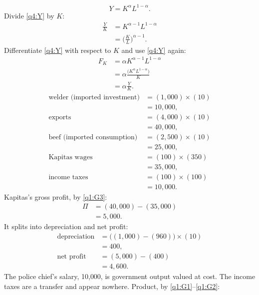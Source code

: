 \begin{sol}
\begin{equation}
Y=K^{\alpha}L^{1-\alpha}. \label{q4:Y}
\end{equation}
Divide \eqref{q4:Y} by $K$:
\begin{align*}
\frac YK &= K^{\alpha-1}L^{1-\alpha}\\
&= \Big(\frac KL\Big)^{\alpha-1}.
\end{align*}
Differentiate \eqref{q4:Y} with respect to $K$ and use \eqref{q4:Y} again:
\begin{align}
F_K &= \alpha K^{\alpha-1}L^{1-\alpha} \nonumber\\
&= \alpha\frac{\big(K^{\alpha}L^{1-\alpha}\big)}{K} \nonumber\\
&= \alpha\frac YK. \label{q4:FK}
\end{align}
\begin{align*}
\text{welder (imported investment)} &= (1{,}000)\times(10)\\
&= 10{,}000,\\
\text{exports} &= (4{,}000)\times(10)\\
&= 40{,}000,\\
\text{beef (imported consumption)} &= (2{,}500)\times(10)\\
&= 25{,}000,\\
\text{Kapitas wages} &= (100)\times(350)\\
&= 35{,}000,\\
\text{income taxes} &= (100)\times(100)\\
&= 10{,}000.
\end{align*}
Kapitas's gross profit, by \eqref{q1:G3}:
\begin{align*}
\Pi &= (40{,}000)-(35{,}000)\\
&= 5{,}000 .
\end{align*}
It splits into depreciation and net profit:
\begin{align*}
\text{depreciation} &= \big((1{,}000)-(960)\big)\times(10)\\
&= 400,\\
\text{net profit} &= (5{,}000)-(400)\\
&= 4{,}600.
\end{align*}
The police chief's salary, 10{,}000, is government output valued at cost. The income taxes are a transfer and appear nowhere.
Product, by \eqref{q1:G1}--\eqref{q1:G2}:
\begin{align}

\end{align}
\end{sol}
